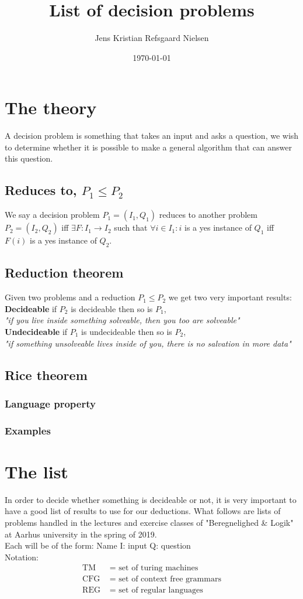\documentclass{article}
\theoremstyle{remark}
\numberwithin{equation}{section}
\begin{document}
	\author{Jens Kristian Refsgaard Nielsen}
	\title{List of decision problems}
	\date{\today}
	\maketitle
\section{The theory}
A decision problem is something that takes an input and asks a question, we wish to determine whether it is possible to make a general algorithm that can answer this question.\\
\subsection{Reduces to, $P_1\leq P_2$}
We say a decision problem $P_1=(I_1,Q_1)$ reduces to another problem $P_2=(I_2,Q_2)$ iff $\exists F:I_1\rightarrow I_2$ such that $\forall i \in I_1 : i $ is a yes instance of $Q_1$ iff $F(i)$ is a yes instance of $Q_2$.
\subsection{Reduction theorem}
Given two problems and a reduction $P_1\leq P_2$ we get two very important results:\\
\textbf{Decideable} if $P_2$ is decideable then so is $P_1$,
\\\indent\textit{"if you live inside something solveable, then you too are solveable"}\\
\textbf{Undecideable} if $P_1$ is undecideable then so is $P_2$,
\\\indent\textit{"if something unsolveable lives inside of you, there is no salvation in more data"}\\
\subsection{Rice theorem}
\subsubsection{Language property}
\subsubsection{Examples}
\section{The list}
In order to decide whether something is decideable or not, it is very important to have a good list of results to use for our deductions. What follows are lists of problems handled in the lectures and exercise classes of "Beregnelighed \& Logik" at Aarhus university in the spring of 2019.\\
Each will be of the form: Name I: input Q: question\\
Notation:
\begin{align*}
	\text{TM }&=\text{ set of turing machines}\\
	\text{CFG }&=\text{ set of context free grammars}\\
	\text{REG }&=\text{ set of regular languages}
\end{align*}
\end{document}
